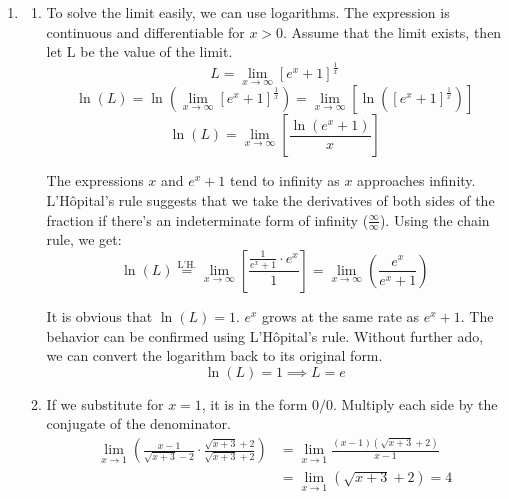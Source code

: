 \documentclass[a4paper, 12pt]{article}
\renewcommand{\headrulewidth}{0pt}
\renewcommand{\headrulewidth}{0pt}
\begin{document}
\newpage
{}
{}

\newpage
\pagestyle{fancy}
\renewcommand{\headrulewidth}{1pt}


\begin{enumerate}[leftmargin=*,label=\textbf{\arabic*.}]
\item \begin{enumerate}[leftmargin=*,label=\textbf{\alph*.}]
\item To solve the limit easily, we can use logarithms. The expression is continuous and differentiable for $x > 0$. Assume that the limit exists, then let L be the value of the limit.
\[ L = \lim_{x \to \infty} [ e^x + 1]^{\frac{1}{x}} \]
\[
\ln(L) = \ln\left(\lim_{x \to \infty} [ e^x + 1]^{\frac{1}{x}}\right) = \lim_{x \to \infty} \left[ \ln\left( [ e^x + 1]^{\frac{1}{x}} \right) \right]
\]
\[\ln(L) = \lim_{x \to \infty} \left[ \frac{\ln( e^x + 1)}{x}\right]\]

The expressions $x$ and $ e^x + 1$ tend to infinity as $x$ approaches infinity. L'Hôpital's rule suggests that we take the derivatives of both sides of the fraction if there's an indeterminate form of infinity ($\frac{\infty}{\infty}$). Using the chain rule, we get:
\[\ln(L) \overset{\text{L'H.}}{=} \lim_{x \to \infty} \left[ \frac{\frac{1}{ e^x+1} \cdot  e^x}{1}\right] = \lim_{x \to \infty} \left( \frac{ e^x}{ e^x+1} \right)\]

It is obvious that $\ln(L) = 1$. $ e^x$ grows at the same rate as $ e^x + 1$. The behavior can be confirmed using L'Hôpital's rule. Without further ado, we can convert the logarithm back to its original form.
\[\ln(L) = 1\implies\boxed{L=e}\]

\item If we substitute for $x = 1$, it is in the form $0/0$. Multiply each side by the conjugate of the denominator.
\begin{align*}
\lim_{x \to 1}\left(\frac{x-1}{\sqrt{x+3}-2}\cdot\frac{\sqrt{x+3}+2}{\sqrt{x+3}+2}\right)
&=\lim_{x\to1}\frac{(x-1)(\sqrt{x+3}+2)}{x-1}\\
&=\lim_{x\to1}(\sqrt{x+3}+2)=\boxed{4}
\end{align*}
\end{enumerate}


\end{enumerate}
\end{document}
